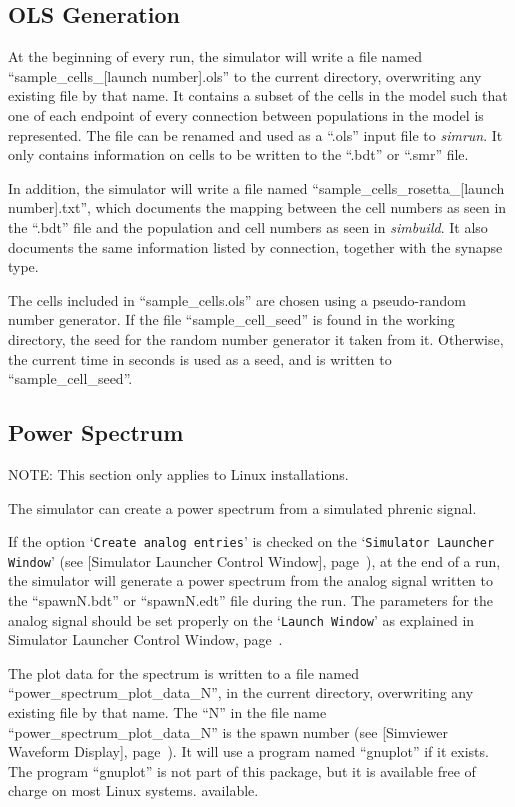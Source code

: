 \documentclass[12pt,openany,oneside]{book}
\newcommand{\tisamp}[1]{`\texttt{#1}'}
\newcommand{\tiref}[1]{#1, page~\pageref{#1}}
\newcommand{\tipxref}[1]{see [#1], page~\pageref{#1}}
\newcommand{\prog}[1]{\textit{{#1}}}
\newcommand{\ext}[1]{{{``.#1''}}}
\newcommand{\inquotes}[1]{{{``#1''}}}
\begin{document}
\subsection{OLS Generation} 
At the beginning of every run, the simulator will write a file named
\inquotes{sample\_cells\_[launch number].ols} to the current directory, overwriting any
existing file by that name. It contains a subset of the cells in the
model such that one of each endpoint of every connection between
populations in the model is represented. The file can be renamed and
used as a \inquotes{.ols} input file to \prog{simrun}.
It only contains information on
cells to be written to the 
\ext{bdt} or \ext{smr} file.

In addition, the simulator will write a file named
\inquotes{sample\_cells\_rosetta\_[launch number].txt}, which documents the mapping between the
cell numbers as seen in the \ext{bdt} file and the population and cell
numbers as seen in \prog{simbuild}. It also documents the same information
listed by connection, together with the synapse type.

The cells included in \inquotes{sample\_cells.ols} are chosen using a
pseudo-random number generator. If the file \inquotes{sample\_cell\_seed} is
found in the working directory, the seed for the random number
generator it taken from it. Otherwise, the current time in seconds is
used as a seed, and is written to \inquotes{sample\_cell\_seed}.

\subsection{Power Spectrum}
\label{Power Spectrum}

NOTE: This section only applies to Linux installations.

The simulator can create a power spectrum from a simulated phrenic signal.

If the option \tisamp{Create analog entries} is checked on the
\tisamp{Simulator Launcher Window} (\tipxref{Simulator Launcher Control
Window}), at the end of a run, the simulator will generate a power
spectrum from the analog signal written to the \inquotes{spawnN.bdt} or
\inquotes{spawnN.edt} file during the run. The parameters for the analog
signal should be set properly on the \tisamp{Launch Window} as explained
in \tiref{Simulator Launcher Control Window}.

The plot data for the spectrum is written to a file named
\inquotes{power\_spectrum\_plot\_data\_N}, in the current directory,
overwriting any existing file by that name. The \inquotes{N} in the file
name \inquotes{power\_spectrum\_plot\_data\_N} is the spawn number
(\tipxref{Simviewer Waveform Display}).  It will use a program named
\inquotes{gnuplot} if it exists. The program \inquotes{gnuplot} is not
part of this package, but it is available free of charge on most Linux
systems.  available.
\end{document}
